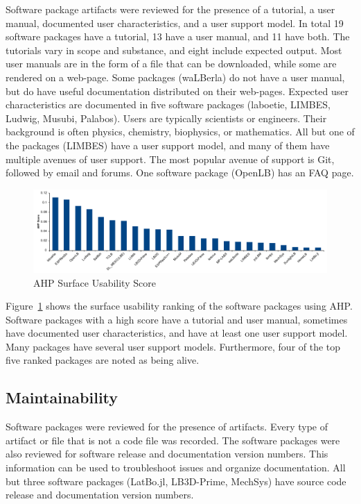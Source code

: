 \documentclass[final, 3p, times, authoryear]{elsarticle}
\begin{document}
Software package artifacts were reviewed for the presence of a tutorial, a user
manual, documented user characteristics, and a user support model. In total 19
software packages have a tutorial, 13 have a user manual, and 11 have both. The
tutorials vary in scope and substance, and eight include expected output.
Most user manuals are in the form of a file that can be downloaded, while some
are rendered on a web-page. Some packages (waLBerla) do not have a user manual,
but do have useful documentation distributed on their web-pages. Expected user
characteristics are documented in five software packages (laboetie, LIMBES,
Ludwig, Musubi, Palabos). Users are typically scientists or engineers. Their background is often physics, chemistry, biophysics, or mathematics. All but one of the packages (LIMBES) have a user support model, and many of them have multiple avenues of user support. The most popular avenue of support is Git, followed by email and forums. One software package (OpenLB) has an FAQ page.    

\begin{figure}[h!]
	\begin{center}
		\includegraphics[width=1.0\textwidth]{./figures/usability_chart.pdf}
		\caption{AHP Surface Usability Score}
		\label{Fig_Usability}
	\end{center}
\end{figure}

Figure~\ref{Fig_Usability} shows the surface usability ranking of the software
packages using AHP. Software packages with a high score have a tutorial and user
manual, sometimes have documented user characteristics, and have at least one
user support model. Many packages have several user support models. Furthermore,
four of the top five ranked packages are noted as being alive. 

\subsection{Maintainability}

Software packages were reviewed for the presence of artifacts. Every type of
artifact or file that is not a code file was recorded. The software packages
were also reviewed for software release and documentation version numbers. This
information can be used to troubleshoot issues and organize documentation. All
but three software packages (LatBo.jl, LB3D-Prime, MechSys) have source code
release and documentation version numbers.
\end{document}
